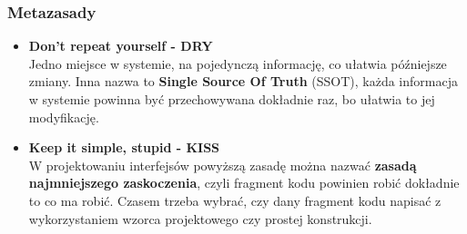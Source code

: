 \documentclass[a4paper]{article}
\begin{document}
    \subsubsection{Metazasady}
    \begin{itemize}
        \item \textbf{Don't repeat yourself - DRY}\\
        Jedno miejsce w systemie, na pojedynczą informację, co ułatwia późniejsze zmiany.
        Inna nazwa to \textbf{Single Source Of Truth} (SSOT), każda informacja w systemie powinna być przechowywana
        dokładnie raz, bo ułatwia to jej modyfikację.
        \item \textbf{Keep it simple, stupid - KISS}\\
        W projektowaniu interfejsów powyższą zasadę można nazwać \textbf{zasadą najmniejszego zaskoczenia}, czyli
        fragment kodu powinien robić dokładnie to co ma robić. Czasem trzeba wybrać, czy dany fragment kodu
        napisać z wykorzystaniem wzorca projektowego czy prostej konstrukcji.
    \end{itemize}
\end{document}
